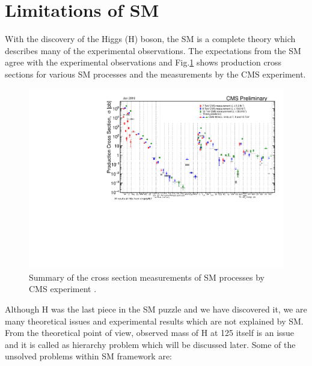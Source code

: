 \section{Limitations of SM}
\label{SMLimitations}
With the discovery of the Higgs (H) boson, the SM is a complete theory which describes many of the experimental observations. The expectations from the SM agree with the experimental observations and Fig.\ref{fig:SigmaNew_v0} shows production cross sections for various SM processes and the measurements by the CMS experiment.
\begin{figure}[h]
\centering
\includegraphics[width=0.9\linewidth]{../Figures/SigmaNew_v0}
\caption[SM cross section measurements by CMS]{Summary of the cross section measurements of SM processes by CMS experiment \cite{SMxsec}.}
\label{fig:SigmaNew_v0}
\end{figure}
Although H was the last piece in the SM puzzle and we have discovered it, we are many theoretical issues and experimental results which are not explained by SM. From the theoretical point of view, observed mass of H at 125 \gev itself is an issue and it is called as hierarchy problem which will be discussed later. Some of the unsolved problems within SM framework are:
